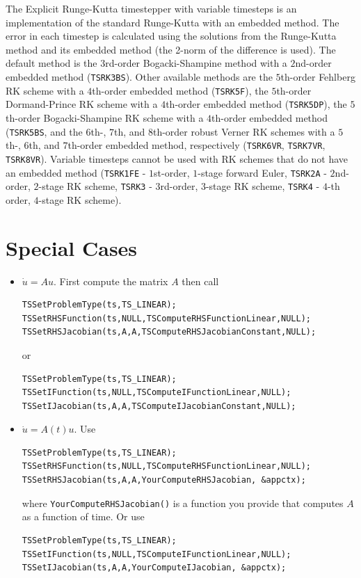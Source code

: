 The Explicit Runge-Kutta timestepper with variable timesteps is an 
implementation of the standard Runge-Kutta with an embedded method. The error in each
timestep is calculated using the solutions from the Runge-Kutta method and its embedded
method (the 2-norm of the difference is used). The default method is the 
$3$rd-order Bogacki-Shampine method with a $2$nd-order embedded method (\lstinline{TSRK3BS}).
Other available methods are the  $5$th-order Fehlberg RK scheme with a $4$th-order embedded
method (\lstinline{TSRK5F}), the  $5$th-order Dormand-Prince RK scheme with a $4$th-order embedded method
(\lstinline{TSRK5DP}), the  $5$th-order Bogacki-Shampine RK scheme with a $4$th-order embedded method
(\lstinline{TSRK5BS}, and the  $6$th-, $7$th, and $8$th-order robust Verner RK schemes with a
$5$th-, $6$th, and $7$th-order embedded method, respectively (\lstinline{TSRK6VR}, \lstinline{TSRK7VR}, \lstinline{TSRK8VR}).
Variable timesteps cannot be used with RK schemes that do not have an embedded
method (\lstinline{TSRK1FE} - $1$st-order, $1$-stage forward Euler, \lstinline{TSRK2A} - $2$nd-order, $2$-stage RK scheme,
\lstinline{TSRK3} - $3$rd-order, $3$-stage RK scheme, \lstinline{TSRK4} - $4$-th order, $4$-stage RK scheme).

\section{Special Cases}

\begin{itemize}
\item $ \dot{u} = A u.$ First compute the matrix $ A$ then call
\begin{lstlisting}
TSSetProblemType(ts,TS_LINEAR);
TSSetRHSFunction(ts,NULL,TSComputeRHSFunctionLinear,NULL);
TSSetRHSJacobian(ts,A,A,TSComputeRHSJacobianConstant,NULL);
\end{lstlisting}
or
\begin{lstlisting}
TSSetProblemType(ts,TS_LINEAR);
TSSetIFunction(ts,NULL,TSComputeIFunctionLinear,NULL);
TSSetIJacobian(ts,A,A,TSComputeIJacobianConstant,NULL);
\end{lstlisting}

\item $ \dot{u} = A(t) u.$ Use
\begin{lstlisting}
TSSetProblemType(ts,TS_LINEAR);
TSSetRHSFunction(ts,NULL,TSComputeRHSFunctionLinear,NULL);
TSSetRHSJacobian(ts,A,A,YourComputeRHSJacobian, &appctx);
\end{lstlisting}
where {\tt YourComputeRHSJacobian()} is a function you provide that computes $A$ as a function of time. Or use
\begin{lstlisting}
TSSetProblemType(ts,TS_LINEAR);
TSSetIFunction(ts,NULL,TSComputeIFunctionLinear,NULL);
TSSetIJacobian(ts,A,A,YourComputeIJacobian, &appctx);
\end{lstlisting}

\end{itemize}

